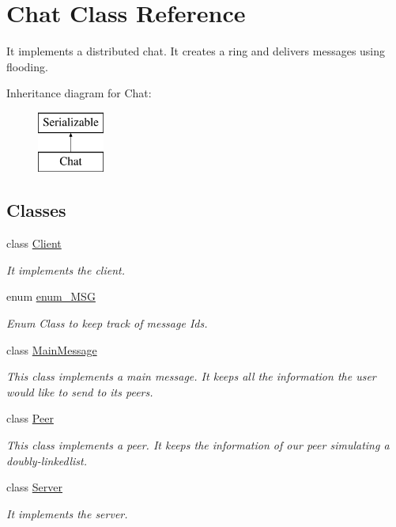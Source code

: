 \hypertarget{class_chat}{}\section{Chat Class Reference}
\label{class_chat}


It implements a distributed chat. It creates a ring and delivers messages using flooding.  


Inheritance diagram for Chat\+:\begin{figure}[H]
\begin{center}
\leavevmode
\includegraphics[height=2.000000cm]{class_chat}
\end{center}
\end{figure}
\subsection*{Classes}
\begin{DoxyCompactItemize}
\item 
class \hyperlink{class_chat_1_1_client}{Client}
\begin{DoxyCompactList}\small\item\em It implements the client. \end{DoxyCompactList}\item 
enum \hyperlink{enum_chat_1_1enum___m_s_g}{enum\+\_\+\+M\+SG}
\begin{DoxyCompactList}\small\item\em Enum Class to keep track of message Ids. \end{DoxyCompactList}\item 
class \hyperlink{class_chat_1_1_main_message}{Main\+Message}
\begin{DoxyCompactList}\small\item\em This class implements a main message. It keeps all the information the user would like to send to its peers. \end{DoxyCompactList}\item 
class \hyperlink{class_chat_1_1_peer}{Peer}
\begin{DoxyCompactList}\small\item\em This class implements a peer. It keeps the information of our peer simulating a doubly-\/linkedlist. \end{DoxyCompactList}\item 
class \hyperlink{class_chat_1_1_server}{Server}
\begin{DoxyCompactList}\small\item\em It implements the server. \end{DoxyCompactList}\end{DoxyCompactItemize}

